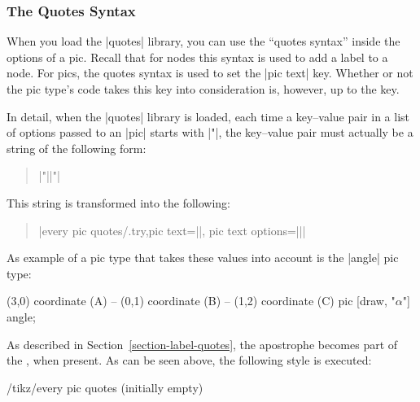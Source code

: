 



\subsubsection{The Quotes Syntax}
\label{section-pic-quotes}

When you load the |quotes| library, you can use the ``quotes syntax''
inside the options of a pic. Recall that for nodes this syntax is used
to add a label to a node. For pics, the quotes syntax is used to set
the |pic text| key. Whether or not the pic type's code takes this key
into consideration is, however, up to the key.

In detail, when the |quotes| library is loaded, each time a key--value 
pair in a list of options passed to an |pic| starts with |"|, the
key--value pair must actually be a string of the following form:
\begin{quote}
  |"||"|
\end{quote}
This string is transformed into the following:
\begin{quote}
  |every pic quotes/.try,pic text=||, pic text options={||}|
\end{quote}

As example of a pic type that takes these values into account is the
|angle| pic type:
\begin{codeexample}[]
\tikz \draw (3,0) coordinate (A)
         -- (0,1) coordinate (B)
         -- (1,2) coordinate (C)
            pic [draw, "$\alpha$"] {angle};
\end{codeexample}

As described in Section~\ref{section-label-quotes}, the apostrophe
becomes part of the , when present. As can be seen
above, the following style is executed:
\begin{stylekey}{/tikz/every pic quotes (initially \normalfont empty)}
\end{stylekey}

